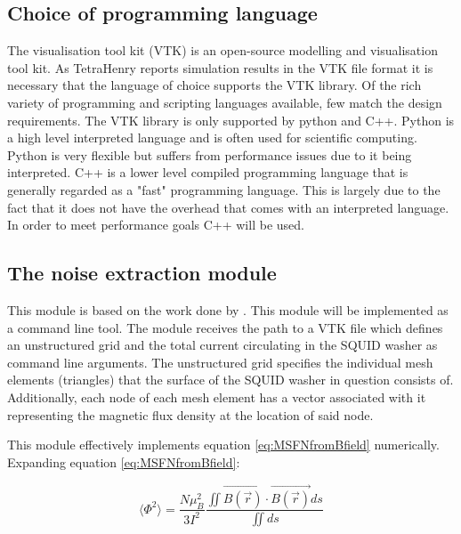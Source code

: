 \subsection{Choice of programming language}
The visualisation tool kit (VTK) is an open-source modelling and visualisation tool kit. As TetraHenry reports simulation results in the VTK file format it is necessary that the language of choice supports the VTK library. Of the rich variety of programming and scripting languages available, few match the design requirements. The VTK library is only supported by python and C++. Python is a high level interpreted language and is often used for scientific computing. Python is very flexible but suffers from performance issues due to it being interpreted. C++ is a lower level compiled programming language that is generally regarded as a "fast" programming language. This is largely due to the fact that it does not have the overhead that comes with an interpreted language. In order to meet performance goals C++ will be used.

\subsection{The noise extraction module}
This module is based on the work done by \cite{fluxNoiseSquidsStevenAnton}. This module will be implemented as a command line tool. The module receives the path to a VTK file which defines an unstructured grid and the total current circulating in the SQUID washer as command line arguments. The unstructured grid specifies the individual mesh elements (triangles)  that the surface of the SQUID washer in question consists of. Additionally, each node of each mesh element has a vector associated with it representing the magnetic flux density at the location of said node. \par
This module effectively implements equation \ref{eq:MSFNfromBfield} numerically. Expanding equation \ref{eq:MSFNfromBfield}:


\begin{equation}
    \langle \Phi ^2 \rangle = \frac{N\mu_B^2}{3I^2} \frac{\iint \Vec{B(\Vec{r})}\cdot\Vec{B(\Vec{r})} ds}{\iint ds}
    \label{eq:MSFNexpanded}
\end{equation}


